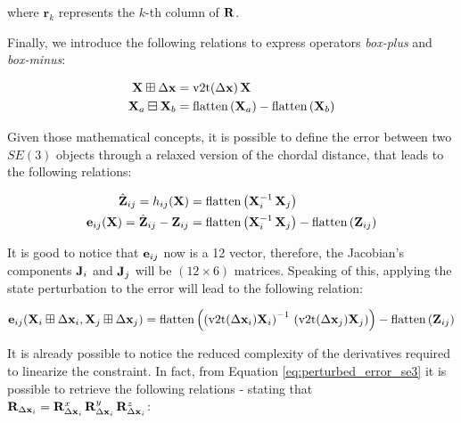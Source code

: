 \noindent where $\mathbf{r}_k$ represents the $k$-th column of $\mathbf{R}$.

Finally, we introduce the following relations to express operators \textit{box-plus} and \textit{box-minus}:

\begin{align}
    \label{eq:boxplus_se3}
    \SState \boxplus \dx &= \v2t(\dx)\, \SState \\
    \label{eq:boximus_se3}
    \SState_a \boxminus \SState_b &= \flatten{\SState_a} - \flatten{\SState_b}
\end{align}

Given those mathematical concepts, it is possible to define the error between two $SE(3)$ objects through a relaxed version of the chordal distance, that leads to the following relations:

\begin{align}
    \label{eq:prediction_se3}
    \hat{\mathbf{Z}}_{ij} = h_{ij}(\mathbf{X}) &= \text{flatten}\left({\mathbf{X}_i^{-1}\,\mathbf{X}_j}\right) \\
    \label{eq:error_se3}
    \mathbf{e}_{ij}(\mathbf{X}) = \hat{\mathbf{Z}}_{ij} - \mathbf{Z}_{ij} &= \text{flatten}\left({\mathbf{X}_i^{-1}\, \mathbf{X}_j}\right) - \text{flatten}\left({\mathbf{Z}_{ij}}\right)
\end{align}

\noindent It is good to notice that $\mathbf{e}_{ij}$ now is a 12 vector, therefore, the Jacobian's components $\mathbf{J}_i$ and $\mathbf{J}_j$ will be $(12\times6)$ matrices. Speaking of this, applying the state perturbation to the error will lead to the following relation:

\begin{equation}
    \label{eq:perturbed_error_se3}
    \error_{ij}(\SState_i \boxplus \dx_i, \SState_j \boxplus \dx_j) = \flatten{\left(\v2t(\dx_i)\SState_i\right)^{-1}\,\left(\v2t(\dx_j)\SState_j\right)} - \flatten{\Meas_{ij}}
\end{equation}

\noindent It is already possible to notice the reduced complexity of the derivatives required to linearize the constraint. In fact, from Equation \ref{eq:perturbed_error_se3} it is possible to retrieve the following relations - stating that $\mathbf{R}_{\Delta \mathbf{x}_i} = \mathbf{R}_{\Delta \mathbf{x}_i}^x \, \mathbf{R}_{\Delta \mathbf{x}_i}^y \, \mathbf{R}_{\Delta \mathbf{x}_i}^z$:

